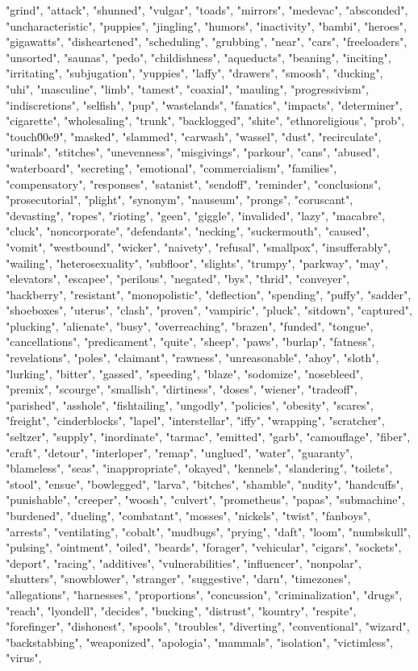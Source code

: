 "grind", "attack", "shunned", "vulgar", "toads", "mirrors", "medevac", "absconded", "uncharacteristic", "puppies", "jingling", "humors", "inactivity", "bambi", "heroes", "gigawatts", "disheartened", "scheduling", "grubbing", "near", "cars", "freeloaders", "unsorted", "saunas", "pedo", "childishness", "aqueducts", "beaning", "inciting", "irritating", "subjugation", "yuppies", "laffy", "drawers", "smoosh", "ducking", "uhi", "masculine", "limb", "tamest", "coaxial", "mauling", "progressivism", "indiscretions", "selfish", "pup", "wastelands", "fanatics", "impacts", "determiner", "cigarette", "wholesaling", "trunk", "backlogged", "shite", "ethnoreligious", "prob", "touch\u00e9", "masked", "slammed", "carwash", "wassel", "dust", "recirculate", "urinals", "stitches", "unevenness", "misgivings", "parkour", "cans", "abused", "waterboard", "secreting", "emotional", "commercialism", "families", "compensatory", "responses", "satanist", "sendoff", "reminder", "conclusions", "prosecutorial", "plight", "synonym", "nauseum", "prongs", "coruscant", "devasting", "ropes", "rioting", "geen", "giggle", "invalided", "lazy", "macabre", "cluck", "noncorporate", "defendants", "necking", "suckermouth", "caused", "vomit", "westbound", "wicker", "naivety", "refusal", "smallpox", "insufferably", "wailing", "heterosexuality", "subfloor", "slights", "trumpy", "parkway", "may", "elevators", "escapee", "perilous", "negated", "bys", "thrid", "conveyer", "hackberry", "resistant", "monopolistic", "deflection", "spending", "puffy", "sadder", "shoeboxes", "uterus", "clash", "proven", "vampiric", "pluck", "sitdown", "captured", "plucking", "alienate", "busy", "overreaching", "brazen", "funded", "tongue", "cancellations", "predicament", "quite", "sheep", "paws", "burlap", "fatness", "revelations", "poles", "claimant", "rawness", "unreasonable", "ahoy", "sloth", "lurking", "bitter", "gassed", "speeding", "blaze", "sodomize", "nosebleed", "premix", "scourge", "smallish", "dirtiness", "doses", "wiener", "tradeoff", "parished", "asshole", "fishtailing", "ungodly", "policies", "obesity", "scares", "freight", "cinderblocks", "lapel", "interstellar", "iffy", "wrapping", "scratcher", "seltzer", "supply", "inordinate", "tarmac", "emitted", "garb", "camouflage", "fiber", "craft", "detour", "interloper", "remap", "unglued", "water", "guaranty", "blameless", "seas", "inappropriate", "okayed", "kennels", "slandering", "toilets", "stool", "ensue", "bowlegged", "larva", "bitches", "shamble", "nudity", "handcuffs", "punishable", "creeper", "woosh", "culvert", "prometheus", "papas", "submachine", "burdened", "dueling", "combatant", "mosses", "nickels", "twist", "fanboys", "arrests", "ventilating", "cobalt", "mudbugs", "prying", "daft", "loom", "numbskull", "pulsing", "ointment", "oiled", "beards", "forager", "vehicular", "cigars", "sockets", "deport", "racing", "additives", "vulnerabilities", "influencer", "nonpolar", "shutters", "snowblower", "stranger", "suggestive", "darn", "timezones", "allegations", "harnesses", "proportions", "concussion", "criminalization", "drugs", "reach", "lyondell", "decides", "bucking", "distrust", "kountry", "respite", "forefinger", "dishonest", "spools", "troubles", "diverting", "conventional", "wizard", "backstabbing", "weaponized", "apologia", "mammals", "isolation", "victimless", "virus", 